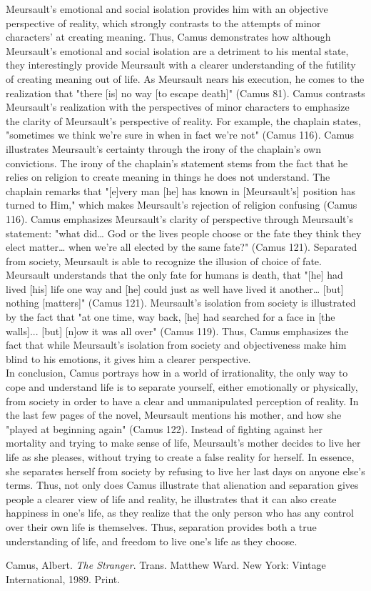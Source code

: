 \documentclass[12pt,a4paper]{article}
\begin{document}
    Meursault's emotional and social isolation provides him with an
    objective perspective of reality, which strongly contrasts to the
    attempts of minor characters' at creating meaning. Thus, Camus
    demonstrates how although Meursault's emotional and social isolation are
    a detriment to his mental state, they interestingly provide Meursault
    with a clearer understanding of the futility of creating meaning out of
    life. As Meursault nears his execution, he comes to the realization that
    "there [is] no way [to escape death]" (Camus 81). Camus contrasts
    Meursault's realization with the perspectives of minor characters to
    emphasize the clarity of Meursault's perspective of reality. For
    example, the chaplain states, "sometimes we think we're sure in when in
    fact we're not" (Camus 116). Camus illustrates Meursault's certainty
    through the irony of the chaplain's own convictions. The irony of the
    chaplain's statement stems from the fact that he relies on religion to
    create meaning in things he does not understand. The chaplain remarks
    that "[e]very man [he] has known in [Meursault's] position has turned to
    Him," which makes Meursault's rejection of religion confusing (Camus 116). Camus
    emphasizes Meursault's clarity of perspective through Meursault's
    statement: "what did… God or the lives people choose or the fate they
    think they elect matter… when we're all elected by the same fate?"
    (Camus 121). Separated from society, Meursault is able to recognize the
    illusion of choice of fate. Meursault understands that the only fate for
    humans is death, that "[he] had lived [his] life one way and [he] could
    just as well have lived it another… [but] nothing [matters]" (Camus
    121). Meursault's isolation from society is illustrated by the fact that
    "at one time, way back, [he] had searched for a face in [the walls]...
    [but] [n]ow it was all over" (Camus 119). Thus, Camus emphasizes the
    fact that while Meursault's isolation from society and objectiveness
    make him blind to his emotions, it gives him a clearer perspective. \\

    In conclusion, Camus portrays how in a world of irrationality, the only
    way to cope and understand life is to separate yourself, either
    emotionally or physically, from society in order to have a clear and
    unmanipulated perception of reality. In the last few pages of the novel,
    Meursault mentions his mother, and how she "played at beginning again"
    (Camus 122). Instead of fighting against her mortality and trying to
    make sense of life, Meursault's mother decides to live her life as she
    pleases, without trying to create a false reality for herself. In
    essence, she separates herself from society by refusing to live her last
    days on anyone else's terms. Thus, not only does Camus illustrate that
    alienation and separation gives people a clearer view of life and
    reality, he illustrates that it can also create happiness in one's life,
    as they realize that the only person who has any control over their own
    life is themselves. Thus, separation provides both a true understanding
    of life, and freedom to live one's life as they choose.

    \begin{workscited}
        \bibent
        Camus, Albert. \textit{The Stranger}. Trans. Matthew Ward. New York:
            Vintage International, 1989. Print.
    \end{workscited}
\end{document}
